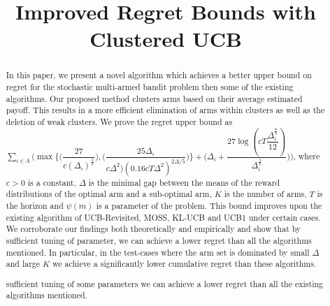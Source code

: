 \documentclass[11pt,letterpaper,english]{article}
\begin{document}
\title{Improved Regret Bounds with Clustered UCB}

\author{}


\renewcommand\Authands{ and }

\date{}

\maketitle

\begin{abstract}
In this paper, we present a novel algorithm which achieves a better upper bound on regret for the stochastic multi-armed bandit problem then some of the existing algorithms. Our proposed method clusters arms based on their average estimated payoff. This results in a more efficient elimination of arms within clusters as well as the deletion of weak clusters. We prove the regret upper bound  as 
$\sum_{i\in A}\bigg (\max{\bigg\lbrace \bigg(\dfrac{27}{c(\Delta_{i})^{\frac{3}{5}}}\bigg) ,\bigg(\dfrac{25\Delta_{i}}{c\Delta^{2})(0.16cT\Delta^{2})^{2\Delta/5}}\bigg)\bigg\rbrace} + \bigg(\Delta_{i}+\dfrac{27\log{(cT\dfrac{\Delta_{i}^{\frac{8}{5}}}{12})}}{\Delta_{i}^{\frac{3}{5}}}\bigg)\bigg)$, where $c>0$ is a constant, $\Delta$ is the minimal gap between the means of the reward distributions of the optimal arm and a sub-optimal arm, $K$ is the number of arms, $T$ is the horizon and $\psi(m)$ is a parameter of the problem. This bound improves upon the existing algorithm of UCB-Revisited, MOSS, KL-UCB and UCB1 under certain cases. We corroborate our findings both theoretically and empirically and show that by sufficient tuning of parameter, we can achieve a lower regret than all the algorithms mentioned. In particular, in the test-cases where the arm set is dominated by small $\Delta$ and large $K$ we achieve a significantly lower cumulative regret than these algorithms.


sufficient tuning of some parameters we can achieve a lower regret than all the existing algorithms mentioned.
\end{abstract}
\end{document}
